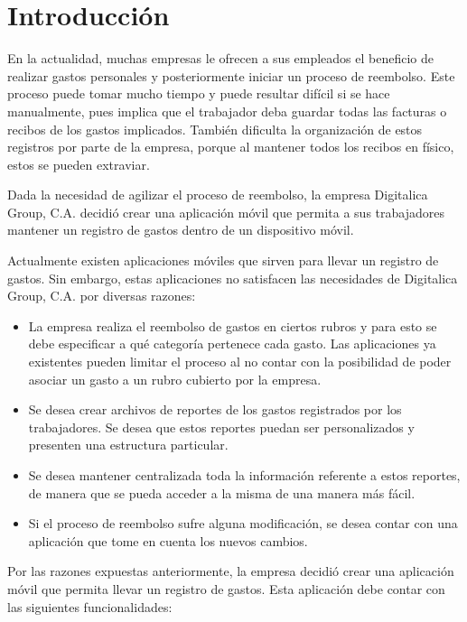 \chapter*{Introducción} \label{sec:Introduccion}

\vspace{5 mm}
En la actualidad, muchas empresas le ofrecen a sus empleados el beneficio de realizar gastos personales y posteriormente iniciar un proceso de reembolso. Este proceso puede tomar mucho tiempo y puede resultar difícil si se hace manualmente, pues implica que el trabajador deba guardar todas las facturas o recibos de los gastos implicados. También dificulta la organización de estos registros por parte de la empresa, porque al mantener todos los recibos en físico, estos se pueden extraviar. 

Dada la necesidad de agilizar el proceso de reembolso, la empresa Digitalica Group, C.A. decidió crear una aplicación móvil que permita a sus trabajadores mantener un registro de gastos dentro de un dispositivo móvil.

Actualmente existen aplicaciones móviles que sirven para llevar un registro de gastos. Sin embargo, estas aplicaciones no satisfacen las necesidades de Digitalica Group, C.A. por diversas razones:

\begin{itemize}
\item La empresa realiza el reembolso de gastos en ciertos rubros y para esto se debe especificar a qué categoría pertenece cada gasto. Las aplicaciones ya existentes pueden limitar el proceso al no contar con la posibilidad de poder asociar un gasto a un rubro cubierto por la empresa.
\item Se desea crear archivos de reportes de los gastos registrados por los trabajadores. Se desea que estos reportes puedan ser personalizados y presenten una estructura particular.
\item Se desea mantener centralizada toda la información referente a estos reportes, de manera que se pueda acceder a la misma de una manera más fácil.
\item Si el proceso de reembolso sufre alguna modificación, se desea contar con una aplicación que tome en cuenta los nuevos cambios.
\end{itemize}

Por las razones expuestas anteriormente, la empresa decidió crear una aplicación móvil que permita llevar un registro de gastos. Esta aplicación debe contar con las siguientes funcionalidades:

